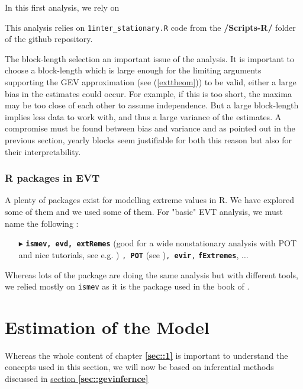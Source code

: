 \documentclass[11pt,a4paper,openany ]{book}
\begin{document}
In this first analysis, we rely on 

This analysis relies on \texttt{1inter\_stationary.R} code from the \textbf{/Scripts-R/} folder of the github repository.



The block-length selection an important issue of the analysis. It is important to choose a block-length which is large enough for the limiting arguments supporting the GEV approximation (see (\ref{exttheom})) to be valid, either a large bias in the estimates could occur. For example, if this is too short, the maxima may be too close of each other to assume independence. But a large block-length implies less data to work with, and thus a large variance of the estimates. A compromise must be found between bias and variance and as pointed out in the previous section, yearly blocks seem justifiable for both this reason but also for their interpretability.

\subsubsection*{R packages in EVT}

A plenty of packages exist for modelling extreme values in R. We have explored some of them and we used some of them. For "basic" EVT analysis, we must name the following : 
\vspace*{-.2cm}
\begin{itemize}
\item[$\blacktriangleright$] \textbf{\texttt{ismev, evd, extRemes}} (good for a wide nonstationary analysis with POT and nice tutorials, see e.g. \citet{gilleland_extremes_2016})  \texttt{, \textbf{POT}} (see \citet{ribatet_users_2006})\texttt{, \textbf{evir},} \texttt{\textbf{fExtremes}}, $\dots$
\end{itemize}

Whereas lots of the package are doing the same analysis but with different tools, we relied mostly on \texttt{ismev} as it is the package used in the book of \citet{coles_introduction_2001}.

\section{Estimation of the Model}

Whereas the whole content of chapter \hyperref[sec::1]{\textbf{\ref{sec::1}}} is important to understand the concepts used in this section, we will now be based on inferential methods discussed in \hyperref[sec::gevinfernce]{section\textbf{ \ref{sec::gevinfernce}}}
\end{document}
